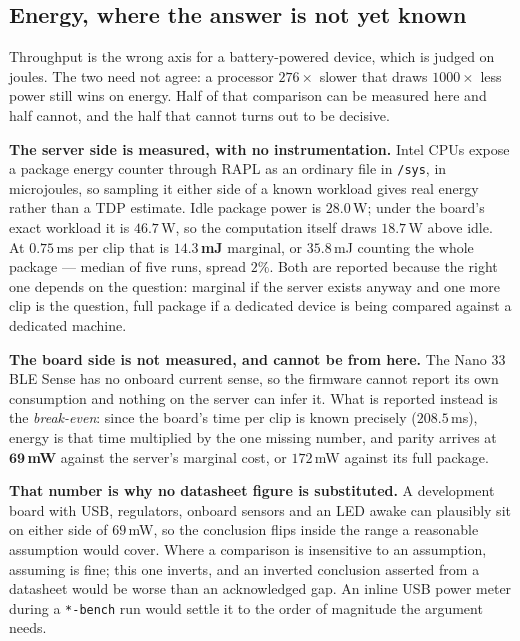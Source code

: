 \documentclass[11pt]{article}
\begin{document}
\subsection{Energy, where the answer is not yet known}
\label{sec:firmware-energy}

Throughput is the wrong axis for a battery-powered device, which is judged on
joules. The two need not agree: a processor $276\times$ slower that draws
$1000\times$ less power still wins on energy. Half of that comparison can be
measured here and half cannot, and the half that cannot turns out to be
decisive.

\textbf{The server side is measured, with no instrumentation.} Intel CPUs
expose a package energy counter through RAPL as an ordinary file in
\texttt{/sys}, in microjoules, so sampling it either side of a known workload
gives real energy rather than a TDP estimate. Idle package power is
$28.0$\,W; under the board's exact workload it is $46.7$\,W, so the
computation itself draws $18.7$\,W above idle. At $0.75$\,ms per clip that is
$\mathbf{14.3}$\,\textbf{mJ} marginal, or $35.8$\,mJ counting the whole
package --- median of five runs, spread $2\%$. Both are reported because the
right one depends on the question: marginal if the server exists anyway and
one more clip is the question, full package if a dedicated device is being
compared against a dedicated machine.

\textbf{The board side is not measured, and cannot be from here.} The Nano 33
BLE Sense has no onboard current sense, so the firmware cannot report its own
consumption and nothing on the server can infer it. What is reported instead
is the \emph{break-even}: since the board's time per clip is known precisely
($208.5$\,ms), energy is that time multiplied by the one missing number, and
parity arrives at $\mathbf{69}$\,\textbf{mW} against the server's marginal
cost, or $172$\,mW against its full package.

\textbf{That number is why no datasheet figure is substituted.} A development
board with USB, regulators, onboard sensors and an LED awake can plausibly
sit on either side of $69$\,mW, so the conclusion flips inside the range a
reasonable assumption would cover. Where a comparison is insensitive to an
assumption, assuming is fine; this one inverts, and an inverted conclusion
asserted from a datasheet would be worse than an acknowledged gap. An inline
USB power meter during a \texttt{*-bench} run would settle it to the
order of magnitude the argument needs.
\end{document}
